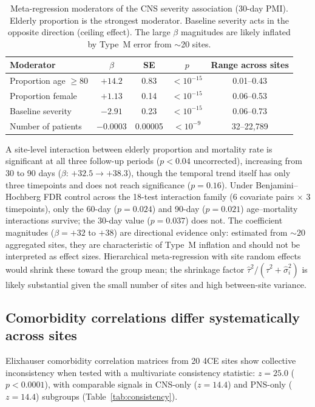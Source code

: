 \documentclass{article}
\begin{document}
\begin{table}[t]
\centering
\caption{Meta-regression moderators of the CNS severity association (30-day
PMI).  Elderly proportion is the strongest moderator.  Baseline severity
acts in the opposite direction (ceiling effect).  The large $\beta$
magnitudes are likely inflated by Type~M error \cite{gelman2014typeMS} from
$\sim$20 sites.}
\label{tab:moderators}
\begin{tabular}{lcccc}
\toprule
Moderator & $\beta$ & SE & $p$ & Range across sites \\
\midrule
Proportion age $\geq 80$ & $+14.2$ & 0.83 & $< 10^{-15}$ & 0.01--0.43 \\
Proportion female & $+1.13$ & 0.14 & $< 10^{-15}$ & 0.06--0.53 \\
Baseline severity & $-2.91$ & 0.23 & $< 10^{-15}$ & 0.06--0.73 \\
Number of patients & $-0.0003$ & 0.00005 & $< 10^{-9}$ & 32--22{,}789 \\
\bottomrule
\end{tabular}
\end{table}

A site-level interaction between elderly proportion and mortality rate is
significant at all three follow-up periods ($p < 0.04$ uncorrected),
increasing from 30 to 90 days ($\beta$: $+32.5 \to +38.3$), though the
temporal trend itself has only three timepoints and does not reach
significance ($p = 0.16$).  Under Benjamini--Hochberg FDR control across the
18-test interaction family (6 covariate pairs $\times$ 3 timepoints),
only the 60-day ($p = 0.024$) and 90-day ($p = 0.021$) age--mortality
interactions survive; the 30-day value ($p = 0.037$) does not.  The
coefficient magnitudes ($\beta = +32$ to $+38$) are directional evidence
only: estimated from ${\sim}20$ aggregated sites, they are characteristic
of Type~M inflation \cite{gelman2014typeMS} and should not be interpreted
as effect sizes.  Hierarchical meta-regression with site random effects
\cite{gelman2012multilevel} would shrink these toward the group mean;
the shrinkage factor $\hat\tau^2 / (\hat\tau^2 + \hat\sigma_i^2)$ is
likely substantial given the small number of sites and high between-site
variance.


\subsection{Comorbidity correlations differ systematically across sites}

Elixhauser comorbidity correlation matrices \cite{elixhauser1998} from 20
4CE sites show collective inconsistency when tested with a multivariate
consistency statistic: $z = 25.0$ ($p < 0.0001$), with comparable signals
in CNS-only ($z = 14.4$) and PNS-only ($z = 14.4$) subgroups
(Table~\ref{tab:consistency}).
\end{document}
